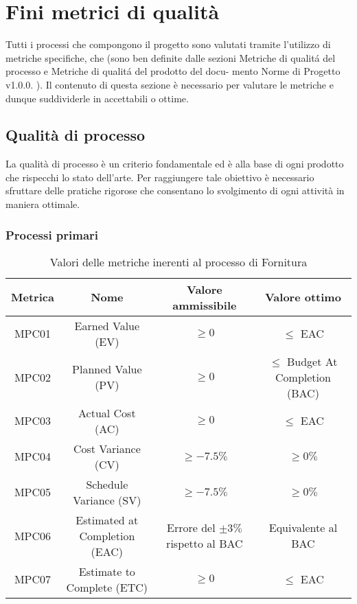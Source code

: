 \documentclass[italian,12pt]{article} %
\begin{document}
\section{Fini metrici di qualità}
Tutti i processi che compongono il progetto sono valutati tramite l'utilizzo 
di metriche specifiche, che (sono ben definite dalle sezioni Metriche di qualitá del processo e Metriche di qualitá del prodotto del docu-
mento Norme di Progetto v1.0.0. ).
Il contenuto di questa sezione è necessario per valutare le metriche e 
dunque suddividerle in accettabili o ottime.

\subsection{Qualità di processo}
La qualità di processo è un criterio fondamentale ed è alla base di ogni prodotto
che rispecchi lo stato dell'arte. Per raggiungere tale obiettivo è necessario 
sfruttare delle pratiche rigorose che consentano lo svolgimento di ogni attività
in maniera ottimale.

\subsubsection{Processi primari}


\begin{table}[h!]
	\centering
	\begin{tabular}{|c|c|c|c|} 
	 \hline
	 Metrica & Nome & Valore ammissibile & Valore ottimo \\  
	 \hline
	 MPC01 & Earned Value (EV) & $\geq 0$ & $\leq$ EAC \\
	 \hline
	 MPC02 & Planned Value (PV) & $\geq 0$ & $\leq$ Budget At Completion (BAC) \\ 
	 \hline
	 MPC03 & Actual Cost (AC) & $\geq 0$ & $\leq$ EAC \\ 
	 \hline
	 MPC04 & Cost Variance (CV) & $\geq -7.5\%$ & $\geq 0\%$ \\ 
	 \hline
	 MPC05 & Schedule Variance (SV) & $\geq -7.5\%$ & $\geq 0\%$ \\ 
	 \hline
	 MPC06 & Estimated at Completion (EAC) & Errore del $\pm 3\%$ rispetto al BAC  & Equivalente al BAC \\ 
	 \hline
	 MPC07 & Estimate to Complete (ETC)  & $\geq 0$ & $\leq$ EAC \\ 
	 \hline
	\end{tabular}
	\caption{ Valori delle metriche inerenti al processo di Fornitura}
	\label{table:1}
	\end{table}
\end{document}
